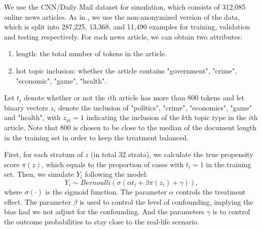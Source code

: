 \documentclass{article}
\begin{document}
	We use the CNN/Daily Mail dataset \parencite{nallapati2016abstractive} for simulation, which consists of 312,085 online news articles. As in \cite{see2017get}, we use the non-anonymized version of the data, which is split into 287,225, 13,368, and 11,490 examples for training, validation and testing respectively.  For each news article, we can obtain two attributes:
	\begin{enumerate}
		\item length: the total number of tokens in the article.
		\item hot topic inclusion: whether the article contains "government", "crime", "economic", "game", "health".
	\end{enumerate}
	
	Let $t_i$ denote whether or not the $i$th article has more than 800 tokens and let binary vectors $z_i$ denote the inclusion of "politics", "crime", "economics", "game" and "health", with $z_{ik}=1$ indicating the inclusion of the $k$th topic type in the $i$th article. Note that 800 is chosen to be close to the median of the document length in the training set in order to keep the treatment balanced.
	
	First, for each stratum of $z$ (in total 32 strata), we calculate the true propensity score $\pi(z)$, which equals to the proportion of cases with $t_i = 1$ in the training set. Then, we simulate $Y_i$ following the model: 
	\begin{equation}\label{eq: simulation}
		Y_i \sim Bernoulli (\sigma (\alpha t_i + \beta \pi(z_i) + \gamma)),
	\end{equation}
	where $\sigma(\cdot)$ is the sigmoid function. The parameter $\alpha$ controls the treatment effect. The parameter $\beta$ is used to control the level of confounding, implying the bias had we not adjust for the confounding. And the parameters $\gamma$ is to control the outcome probabilities to stay close to the real-life scenario.
	
\end{document}
